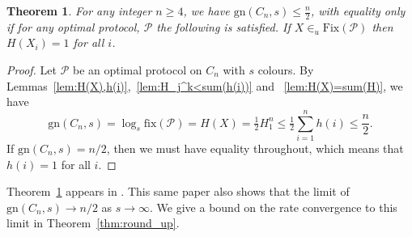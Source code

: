 \documentclass{birkjour}
\newtheorem{thm}{Theorem}[section]
\theoremstyle{indenteddefinition}
\theoremstyle{indenteddefinition}
\numberwithin{equation}{section}
\renewcommand{\Pr}{\mathcal{P}}
\newcommand{\fix}{\mbox{fix}}
\newcommand{\gn}{\mbox{gn}}
\newcommand{\Fix}{\mbox{Fix}}
\begin{document}
\begin{thm}
\label{thm:n/2} \cite{Christofides2011guessing}
For any integer $n \geq 4$, we have $\displaystyle{\gn(C_n,s) \leq \tfrac{n}{2}}$, with equality only if for any optimal protocol, $\Pr$ the following is satisfied. If $X \in_u \Fix(\Pr)$ then $H(X_i)=1$ for all $i$. 
\end{thm}
\begin{proof}
Let $\Pr$ be an optimal protocol on $C_n$ with $s$ colours. By Lemmas~\ref{lem:H(X),h(i)},~\ref{lem:H_j^k<sum(h(i))} and ~\ref{lem:H(X)=sum(H)}, we have 
	$$ \gn(C_n,s) = \log_s\fix(\Pr) = H(X) = \tfrac{1}{2} H_1^n \leq \tfrac{1}{2} \sum_{i=1}^n h(i) \leq \frac{n}{2}. $$
If $\gn(C_n,s)=n/2$, then we must have equality throughout, which means that $h(i)=1$ for all $i$.
\end{proof}

Theorem~\ref{thm:n/2} appears in \cite{Christofides2011guessing}. This same paper also shows that the limit of $\gn(C_n,s) \to n/2$ as $s \rightarrow \infty$. We give a bound on the rate convergence to this limit in Theorem~\ref{thm:round_up}. 
\end{document}
